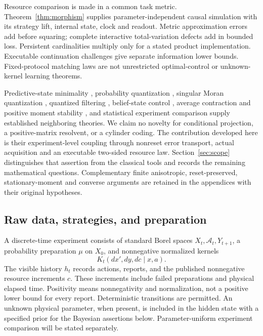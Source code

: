 Resource comparison is made in a common task metric. Theorem~\ref{thm:morphism} supplies parameter-independent causal simulation with its strategy lift, internal state, clock and readout. Metric approximation errors add before squaring; complete interactive total-variation defects add in bounded loss. Persistent cardinalities multiply only for a stated product implementation. Executable continuation challenges give separate information lower bounds. Fixed-protocol matching laws are not unrestricted optimal-control or unknown-kernel learning theorems.

Predictive-state minimality \cite{shalizi,psr}, probability quantization \cite{graf}, singular Moran quantization \cite{zhu-moran}, quantized filtering \cite{pages,sellami,feuer}, belief-state control \cite{saldi}, average contraction and positive moment stability \cite{diaconis,costa,ogura}, and statistical experiment comparison \cite{blackwell,lecam,torgersen} supply established neighboring theories. We claim no novelty for conditional projection, a positive-matrix resolvent, or a cylinder coding. The contribution developed here is their experiment-level coupling through nonreset error transport, actual acquisition and an executable two-sided resource law. Section~\ref{sec:scope} distinguishes that assertion from the classical tools and records the remaining mathematical questions. Complementary finite anisotropic, reset-preserved, stationary-moment and converse arguments are retained in the appendices with their original hypotheses.

\subsection{Raw data, strategies, and preparation}
A discrete-time experiment consists of standard Borel spaces $X_t,\mathcal A_t,Y_{t+1}$, a probability preparation $\mu$ on $X_0$, and nonnegative normalized kernels
\begin{equation}\label{eq:raw}
 K_t(dx',dy,dc\mid x,a).
\end{equation}
The visible history $h_t$ records actions, reports, and the published nonnegative resource increments $c$. These increments include failed preparations and physical elapsed time. Positivity means nonnegativity and normalization, not a positive lower bound for every report. Deterministic transitions are permitted. An unknown physical parameter, when present, is included in the hidden state with a specified prior for the Bayesian assertions below. Parameter-uniform experiment comparison will be stated separately.

